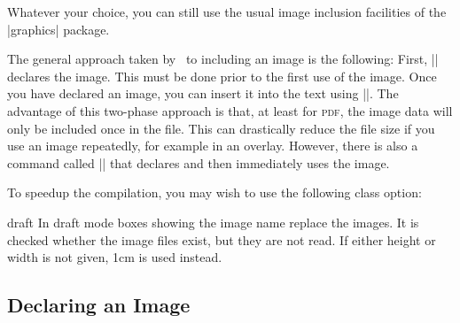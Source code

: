 Whatever your choice, you can still use the usual image inclusion
facilities of the |graphics| package.

The general approach taken by \pgfname\ to including an image is the
following: First, |\pgfdeclareimage| declares the
image. This must be done prior to the first use of the image. Once you
have declared an image, you can insert it into the text using
|\pgfuseimage|. The advantage of this two-phase approach is that, at
least for \textsc{pdf}, the image data will only be included once in the
file. This can drastically reduce the file size if you use an image
repeatedly, for example in an overlay. However, there is also a
command called |\pgfimage| that declares and then immediately uses the
image.

To speedup the compilation, you may wish to use the following class
option:
\begin{packageoption}{draft}
  In draft mode boxes showing the image name replace the
  images. It is checked whether the image files exist, but they are
  not read. If either height or width is not given, 1cm is used
  instead. 
\end{packageoption}

\subsection{Declaring an Image}

